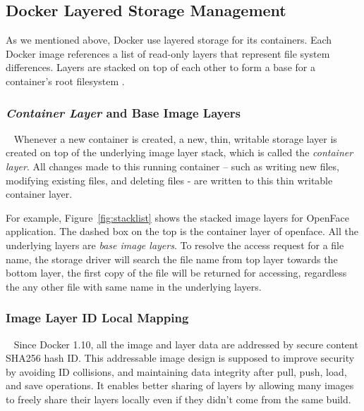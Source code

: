 

\subsection{Docker Layered Storage Management}\label{aufsIntroduction}

As we mentioned above, Docker use layered storage for its containers. Each Docker image references a list of read-only layers that represent file system differences. Layers are stacked on top of each other to form a base for a container's root filesystem \cite{dockerlayer}. 

\smallbreak
\subsubsection{\textit{Container Layer} and Base Image Layers}
~\smallbreak
Whenever a new container is created, a new, thin, writable storage layer is created on top of the underlying image layer stack, which is called the \textit{container layer}. All changes made to this running container -- such as writing new files, modifying existing files, and deleting files - are written to this thin writable container layer\cite{dockerlayer}.


For example, 
Figure~\ref{fig:stacklist} shows the stacked image layers for OpenFace application. The dashed box on the top is the container layer of openface. All the underlying layers are \textit{base image layers}. To resolve the access request for a file name, the storage driver will search the file name from top layer towards the bottom layer, the first copy of the file will be returned for accessing, regardless the any other file with same name in the underlying layers.




\smallbreak
\subsubsection{Image Layer ID Local Mapping}
~\smallbreak
Since Docker 1.10, all the image and layer data are addressed by secure content SHA256 hash ID. 
This addressable image design is supposed to improve security by avoiding ID collisions, and maintaining data integrity after pull, push, load, and save operations. It enables better sharing of layers by allowing many images to freely share their layers locally even if they didn't come from the same build\cite{dockerlayer}. 

